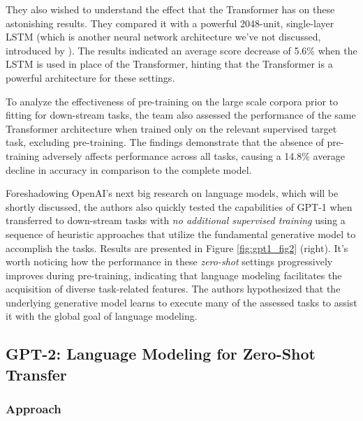 \documentclass{article}
\begin{document}
\medskip
\noindent
They also wished to understand the effect that the Transformer has on these astonishing results. They compared it with a powerful 2048-unit, single-layer LSTM (which is another neural network architecture we've not discussed, introduced by \citet{hochreiter1997lstm}). The results indicated an average score decrease of 5.6\% when the LSTM is used in place of the Transformer, hinting that the Transformer is a powerful architecture for these settings.

\medskip
\noindent
To analyze the effectiveness of pre-training on the large scale corpora prior to fitting for down-stream tasks, the team also assessed the performance of the same Transformer architecture when trained only on the relevant supervised target task, excluding pre-training. The findings demonstrate that the absence of pre-training adversely affects performance across all tasks, causing a 14.8\% average decline in accuracy in comparison to the complete model.

\medskip
\noindent
Foreshadowing OpenAI's next big research on language models, which will be shortly discussed, the authors also quickly tested the capabilities of GPT-1 when transferred to down-stream tasks with \emph{no additional supervised training} using a sequence of heuristic approaches that utilize the fundamental generative model to accomplish the tasks. Results are presented in Figure \ref{fig:gpt1_fig2} (right). It's worth noticing how the performance in these \emph{zero-shot} settings progressively improves during pre-training, indicating that language modeling facilitates the acquisition of diverse task-related features. The authors hypothesized that the underlying generative model learns to execute many of the assessed tasks to assist it with the global goal of language modeling.



\subsection{GPT-2: Language Modeling for Zero-Shot Transfer}
\label{sec:gpt2}

\subsubsection{Approach}
\label{subsec:gpt2-approach}
\end{document}
